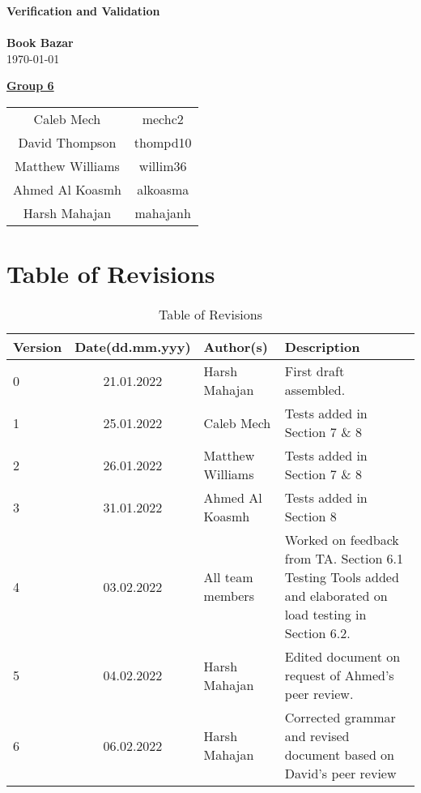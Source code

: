 \documentclass[fullpage]{article}
\begin{document}
\vspace*{\fill}
\begin{center}

  {\Huge \textbf{Verification and Validation}}\\
\hrulefill\\[2mm]
  {\huge \textbf{Book Bazar}}\\[2mm]
{\large \today}\\[15mm]
{\large
\underline{\textbf{Group 6}}\\
\begin{tabular}{ c c }

 Caleb Mech & mechc2\\ 
 David Thompson & thompd10\\
 Matthew Williams & willim36\\
 Ahmed Al Koasmh & alkoasma\\
 Harsh Mahajan	& mahajanh    
\end{tabular}
}

\end{center}

\vspace*{\fill}

\newpage
\begingroup
\hypersetup{hidelinks}
\tableofcontents

\listoffigures
\listoftables
\endgroup
\newpage

\section{Table of Revisions}
\begin{table}[h]
\centering
\begin{tabular}{| l | c | p{4cm}| p{5cm}|}
\hline
 \rowcolor{lightgray} 
\textbf{Version} & \textbf{Date(dd.mm.yyy)} &\textbf{Author(s)} &\textbf{Description}\\
\hline
0 & 21.01.2022 & Harsh Mahajan & First draft assembled.\\
\hline
1 & 25.01.2022 & Caleb Mech & Tests added in Section 7 \& 8\\
\hline
2 & 26.01.2022 & Matthew Williams & Tests added in Section 7 \& 8\\
\hline
3 & 31.01.2022 & Ahmed Al Koasmh & Tests added in Section 8\\
\hline
4& 03.02.2022& All team members & Worked on feedback from TA. Section 6.1 Testing Tools added and elaborated on load testing in Section 6.2.\\
\hline
5& 04.02.2022& Harsh Mahajan & Edited document on request of Ahmed's peer review.\\
\hline
6& 06.02.2022& Harsh Mahajan& Corrected grammar and revised document based on David's peer review\\
\hline
\end{tabular}
\caption{Table of Revisions}

\end{table}
\end{document}
